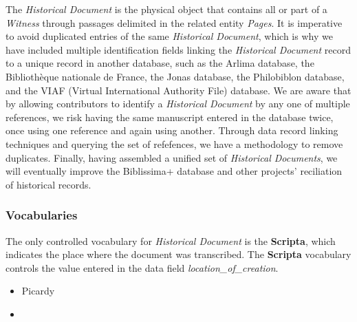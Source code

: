 The \textit{Historical Document} is the physical object that contains all or part of a \textit{Witness} through passages delimited in the related entity \textit{Pages}. It is imperative to avoid duplicated entries of the same \textit{Historical Document}, which is why we have included multiple identification fields linking the \textit{Historical Document} record to a unique record in another database, such as the Arlima database, the Bibliothèque nationale de France, the Jonas database, the Philobiblon database, and the VIAF (Virtual International Authority File) database. We are aware that by allowing contributors to identify a \textit{Historical Document} by any one of multiple references, we risk having the same manuscript entered in the database twice, once using one reference and again using another. Through data record linking techniques and querying the set of refefences, we have a methodology to remove duplicates. Finally, having assembled a unified set of \textit{Historical Documents}, we will eventually improve the Biblissima+ database and other projects' reciliation of historical records.

\subsubsection{Vocabularies}

The only controlled vocabulary for \textit{Historical Document} is the \textbf{Scripta}, which indicates the place where the document was transcribed. The \textbf{Scripta} vocabulary controls the value entered in the data field \textit{location\_of\_creation}.\footnotemark{}

    \begin{itemize}
        \item Picardy
        \item {}
    \end{itemize}

